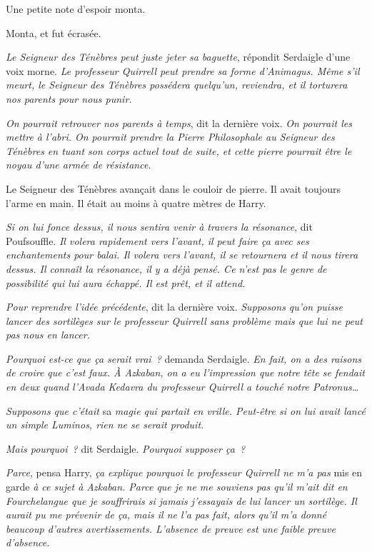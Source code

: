 Une petite note d'espoir monta.

Monta, et fut écrasée.

\emph{Le Seigneur des Ténèbres peut juste jeter sa baguette}, répondit Serdaigle d'une voix morne.
\emph{Le professeur Quirrell peut prendre sa forme d'Animagus.
Même s'il meurt, le Seigneur des Ténèbres possédera quelqu'un, reviendra, et il torturera nos parents pour nous punir.}

\emph{On pourrait retrouver nos parents à temps}, dit la dernière voix.
\emph{On pourrait les mettre à l'abri.
On pourrait prendre la Pierre Philosophale au Seigneur des Ténèbres en tuant son corps actuel tout de suite, et cette pierre pourrait être le noyau d'une armée de résistance.}

Le Seigneur des Ténèbres avançait dans le couloir de pierre.
Il avait toujours l'arme en main.
Il était au moins à quatre mètres de Harry.

\emph{Si on lui fonce dessus, il nous sentira venir à travers la résonance}, dit Poufsouffle.
\emph{Il volera rapidement vers l'avant, il peut faire ça avec ses enchantements pour balai.
Il volera vers l'avant, il se retournera et il nous tirera dessus.
Il connaît la résonance, il y a déjà pensé.
Ce n'est pas le genre de possibilité qui lui aura échappé.
Il est prêt, et il attend.}

\emph{Pour reprendre l'idée précédente}, dit la dernière voix.
\emph{Supposons qu'on puisse lancer des sortilèges sur le professeur Quirrell sans problème mais que lui ne peut pas nous en lancer.}

\emph{Pourquoi est-ce que ça serait vrai~?} demanda Serdaigle.
\emph{En fait, on a des raisons de croire que c'est faux.
À Azkaban, on a eu l'impression que notre tête se fendait en deux quand l'Avada Kedavra du professeur Quirrell a touché notre Patronus…}

\emph{Supposons que c'était} sa \emph{magie qui partait en vrille.
Peut-être si on lui avait lancé un simple Luminos, rien ne se serait produit.}

\emph{Mais pourquoi~?} dit Serdaigle.
\emph{Pourquoi supposer ça~?}

\emph{Parce}, pensa Harry, \emph{ça explique pourquoi le professeur Quirrell ne m'a pas} mis en garde \emph{à ce sujet à Azkaban.
Parce que je ne me souviens pas qu'il m'ait dit en Fourchelangue que je souffrirais si jamais j'essayais de lui lancer un sortilège.
Il aurait pu me prévenir de ça, mais il ne l'a pas fait, alors qu'il m'a donné beaucoup d'autres avertissements.
L'absence de preuve est une faible preuve d'absence.}

